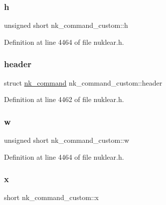 \subsubsection{\texorpdfstring{h}{h}}
{\footnotesize\ttfamily unsigned short nk\+\_\+command\+\_\+custom\+::h}



Definition at line 4464 of file nuklear.\+h.

\mbox{\label{structnk__command__custom_a2694ddc1418ae575b1f2a594327a113a}} 
\subsubsection{\texorpdfstring{header}{header}}
{\footnotesize\ttfamily struct \mbox{\hyperlink{structnk__command}{nk\+\_\+command}} nk\+\_\+command\+\_\+custom\+::header}



Definition at line 4462 of file nuklear.\+h.

\mbox{\label{structnk__command__custom_a13aad7adc5361402e2f375bde35c6cae}} 
\subsubsection{\texorpdfstring{w}{w}}
{\footnotesize\ttfamily unsigned short nk\+\_\+command\+\_\+custom\+::w}



Definition at line 4464 of file nuklear.\+h.

\mbox{\label{structnk__command__custom_a847207902e09d1aa6dc974fc226c463b}} 
\subsubsection{\texorpdfstring{x}{x}}
{\footnotesize\ttfamily short nk\+\_\+command\+\_\+custom\+::x}



